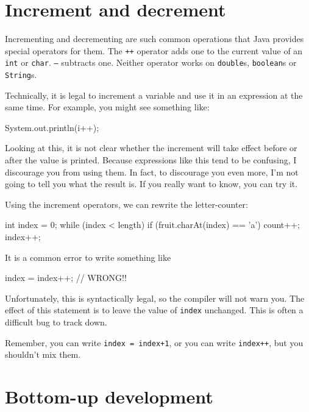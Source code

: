 \section{Increment and decrement}


Incrementing and decrementing are such common operations that Java provides special operators for them.
The {\tt ++} operator adds one to the current value of an {\tt int} or {\tt char}.
{\tt --} subtracts one.
Neither operator works on {\tt double}s, {\tt boolean}s or {\tt String}s.

Technically, it is legal to increment a variable and use it in an expression at the same time.
For example, you might see something like:

\begin{code}
System.out.println(i++);
\end{code}

Looking at this, it is not clear whether the increment will take effect before or after the value is printed.
Because expressions like this tend to be confusing, I discourage you from using them.
In fact, to discourage you even more, I'm not going to tell you what the result is.
If you really want to know, you can try it.

Using the increment operators, we can rewrite the letter-counter:

\begin{code}
int index = 0;
while (index < length) {
    if (fruit.charAt(index) == 'a') {
        count++;
    }
    index++;
}
\end{code}

It is a common error to write something like

\begin{code}
index = index++;             // WRONG!!
\end{code}

Unfortunately, this is syntactically legal, so the compiler will not warn you.
The effect of this statement is to leave the value of {\tt index} unchanged.
This is often a difficult bug to track down.

Remember, you can write {\tt index = index+1}, or you can write {\tt index++}, but you shouldn't mix them.


\section{Bottom-up development}

